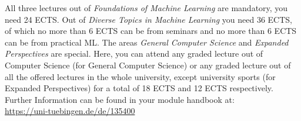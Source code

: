 All three lectures out of \emph{Foundations of Machine Learning} are mandatory, you need 24 ECTS. Out of \emph{Diverse Topics in Machine Learning} you need 36 ECTS, of which no more than 6 ECTS can be from seminars and no more than 6 ECTS can be from practical ML. The areas \emph{General Computer Science} and \emph{Expanded Perspectives} are special. Here, you can attend any graded lecture out of Computer Science (for General Computer Science) or any graded lecture out
of all the offered lectures in the whole university, except university sports (for Expanded Perspectives) for a total of 18 ECTS and 12 ECTS respectively.
Further Information can be found in your module handbook at:\\
\url{https://uni-tuebingen.de/de/135400}
\pagebreak

